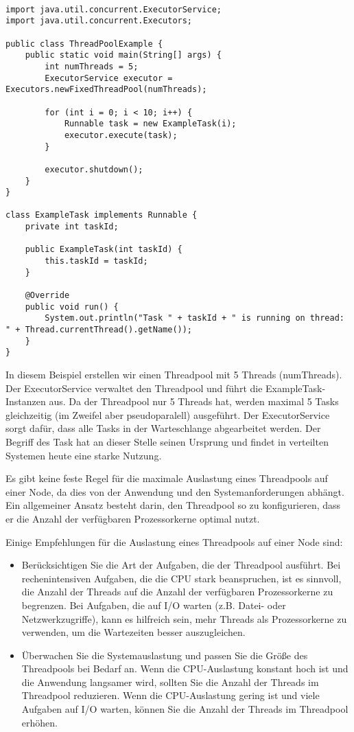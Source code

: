 \begin{lstlisting}[caption={ExecutorService-Klasse},captionpos=b,label={lst:executor}]

import java.util.concurrent.ExecutorService;
import java.util.concurrent.Executors;

public class ThreadPoolExample {
    public static void main(String[] args) {
        int numThreads = 5;
        ExecutorService executor = Executors.newFixedThreadPool(numThreads);

        for (int i = 0; i < 10; i++) {
            Runnable task = new ExampleTask(i);
            executor.execute(task);
        }

        executor.shutdown();
    }
}

class ExampleTask implements Runnable {
    private int taskId;

    public ExampleTask(int taskId) {
        this.taskId = taskId;
    }

    @Override
    public void run() {
        System.out.println("Task " + taskId + " is running on thread: " + Thread.currentThread().getName());
    }
}
\end{lstlisting}
In diesem Beispiel erstellen wir einen Threadpool mit 5 Threads (numThreads). Der ExecutorService verwaltet den Threadpool und führt die ExampleTask-Instanzen aus. Da der Threadpool nur 5 Threads hat, werden maximal 5 Tasks gleichzeitig (im Zweifel aber pseudoparalell) ausgeführt. Der ExecutorService sorgt dafür, dass alle Tasks in der Warteschlange abgearbeitet werden. Der Begriff des Task hat an dieser Stelle seinen Ursprung und findet in verteilten Systemen heute eine starke Nutzung.


Es gibt keine feste Regel für die maximale Auslastung eines Threadpools auf einer Node, da dies von der Anwendung und den Systemanforderungen abhängt. Ein allgemeiner Ansatz besteht darin, den Threadpool so zu konfigurieren, dass er die Anzahl der verfügbaren Prozessorkerne optimal nutzt.

Einige Empfehlungen für die Auslastung eines Threadpools auf einer Node sind:
\begin{itemize}
\item Berücksichtigen Sie die Art der Aufgaben, die der Threadpool ausführt. Bei rechenintensiven Aufgaben, die die CPU stark beanspruchen, ist es sinnvoll, die Anzahl der Threads auf die Anzahl der verfügbaren Prozessorkerne zu begrenzen. Bei Aufgaben, die auf I/O warten (z.B. Datei- oder Netzwerkzugriffe), kann es hilfreich sein, mehr Threads als Prozessorkerne zu verwenden, um die Wartezeiten besser auszugleichen.
\item Überwachen Sie die Systemauslastung und passen Sie die Größe des Threadpools bei Bedarf an. Wenn die CPU-Auslastung konstant hoch ist und die Anwendung langsamer wird, sollten Sie die Anzahl der Threads im Threadpool reduzieren. Wenn die CPU-Auslastung gering ist und viele Aufgaben auf I/O warten, können Sie die Anzahl der Threads im Threadpool erhöhen.
\end{itemize}

